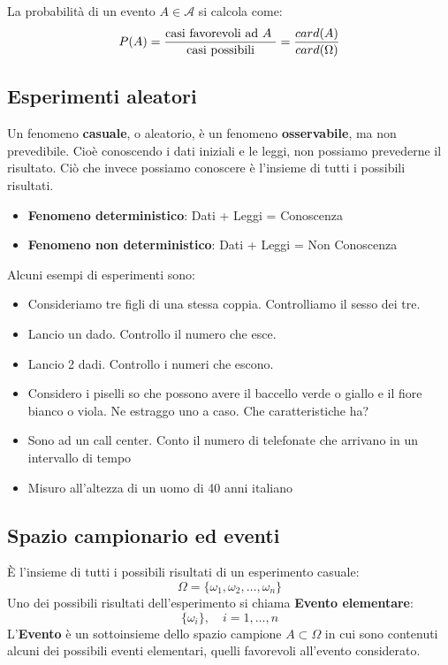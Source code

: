 \documentclass[a4paper]{article}
\theoremstyle{break}
\theoremstyle{break}
\theoremstyle{break}
\theoremstyle{break}
\begin{document}
La probabilità di un evento \( A \in \mathcal{A} \) si calcola come:
\[
	P(A) = \frac{\text{casi favorevoli ad \( A \) }}{\text{casi possibili}} = \frac{card(A)}{card(\Omega)}
\]

\subsection{Esperimenti aleatori}
Un fenomeno \textbf{casuale}, o aleatorio, è un fenomeno \textbf{osservabile}, ma non
prevedibile. Cioè conoscendo i dati iniziali e le leggi, non possiamo prevederne il
risultato. Ciò che invece possiamo conoscere è l'insieme di tutti i possibili risultati.
\begin{itemize}
	\item \textbf{Fenomeno deterministico}: Dati + Leggi = Conoscenza
	\item \textbf{Fenomeno non deterministico}: Dati + Leggi = Non Conoscenza
\end{itemize}

\noindent Alcuni esempi di esperimenti sono:
\begin{itemize}
	\item Consideriamo tre figli di una stessa coppia. Controlliamo il sesso dei tre.
	\item Lancio un dado.
	      Controllo il numero che esce.
	\item Lancio 2 dadi.
	      Controllo i numeri che escono.
	\item Considero i piselli so che possono avere il baccello verde o giallo e il fiore
	      bianco o viola.
	      Ne estraggo uno a caso. Che caratteristiche ha?
	\item Sono ad un call center.
	      Conto il numero di telefonate
	      che arrivano in un intervallo di tempo
	\item Misuro all’altezza di un uomo
	      di 40 anni italiano
\end{itemize}

\subsection{Spazio campionario ed eventi}
È l'insieme di tutti i possibili risultati di un esperimento casuale:
\[
	\Omega = \{\omega_1, \omega_2, \ldots, \omega_n\}
\]
Uno dei possibili risultati dell'esperimento si chiama \textbf{Evento elementare}:
\[
	\{\omega_i\},\quad i = 1, \ldots, n
\]
L'\textbf{Evento} è un sottoinsieme dello spazio campione \( A \subset \Omega \) in cui
sono contenuti alcuni dei possibili eventi elementari, quelli favorevoli all'evento
considerato.
\end{document}

